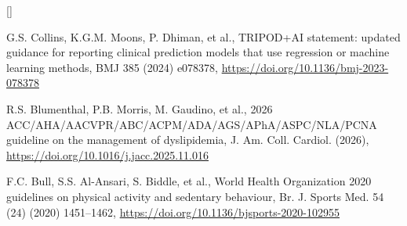 \documentclass[9pt,a4paper]{extarticle}
\newcounter{refc}
\begin{document}
{\begin{list}{[]}{\setlength{\leftmargin}{2.2em}\setlength{\labelwidth}{2em}\setlength{\itemsep}{0.5pt}\setlength{\parsep}{0pt}}
\item G.S. Collins, K.G.M. Moons, P. Dhiman, et al., TRIPOD+AI statement: updated guidance for reporting clinical prediction models that use regression or machine learning methods, BMJ 385 (2024) e078378, \url{https://doi.org/10.1136/bmj-2023-078378}
\item R.S. Blumenthal, P.B. Morris, M. Gaudino, et al., 2026 ACC/AHA/AACVPR/ABC/ACPM/ADA/AGS/APhA/ASPC/NLA/PCNA guideline on the management of dyslipidemia, J. Am. Coll. Cardiol. (2026), \url{https://doi.org/10.1016/j.jacc.2025.11.016}
\item F.C. Bull, S.S. Al-Ansari, S. Biddle, et al., World Health Organization 2020 guidelines on physical activity and sedentary behaviour, Br. J. Sports Med. 54 (24) (2020) 1451–1462, \url{https://doi.org/10.1136/bjsports-2020-102955}
\end{list}}
\end{document}
